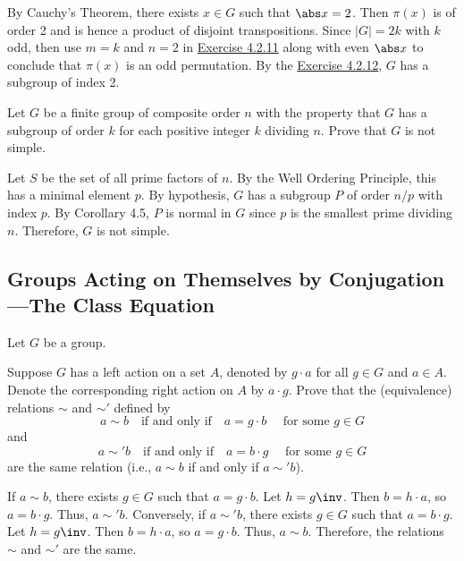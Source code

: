 \begin{sol}
	By Cauchy's Theorem, there exists $x \in G$ such that $\abs x = 2$. Then $\pi(x)$ is of order 2 and is hence a product of disjoint transpositions. Since $|G| = 2k$ with $k$ odd, then use $m = k$ and $n = 2$ in \hyperref[ex4.2.11]{Exercise 4.2.11} along with even $\abs x$ to conclude that $\pi(x)$ is an odd permutation. By the \hyperref[ex4.2.12]{Exercise 4.2.12}, $G$ has a subgroup of index 2.
\end{sol}

\begin{exercise}
	Let $G$ be a finite group of composite order $n$ with the property that $G$ has a subgroup of order $k$ for each positive integer $k$ dividing $n$. Prove that $G$ is not simple.
\end{exercise}

\begin{sol}
	Let $S$ be the set of all prime factors of $n$. By the Well Ordering Principle, this has a minimal element $p$. By hypothesis, $G$ has a subgroup $P$ of order $n/p$ with index $p$. By Corollary 4.5, $P$ is normal in $G$ since $p$ is the smallest prime dividing $n$. Therefore, $G$ is not simple.
\end{sol}

\newpage

\subsection{Groups Acting on Themselves by Conjugation---The Class Equation}

Let $G$ be a group.

\begin{specialexercise}
	Suppose $G$ has a left action on a set $A$, denoted by $g \cdot a$ for all $g \in G$ and $a \in A$. Denote the corresponding right action on $A$ by $a \cdot g$. Prove that the (equivalence) relations $\sim$ and $\sim'$ defined by
	\[ a \sim b \quad \text{if and only if} \quad a = g \cdot b \quad \text{ for some } g \in G \]
	and
	\[ a \sim' b \quad \text{if and only if} \quad a = b \cdot g \quad \text{ for some } g \in G \]
	are the same relation (i.e., $a \sim b$ if and only if $a \sim' b$).
\end{specialexercise}

\begin{sol}
	If $a \sim b$, there exists $g \in G$ such that $a = g \cdot b$. Let $h = g\inv$. Then $b = h \cdot a$, so $a = b \cdot g$. Thus, $a \sim' b$. Conversely, if $a \sim' b$, there exists $g \in G$ such that $a = b \cdot g$. Let $h = g\inv$. Then $b = h \cdot a$, so $a = g \cdot b$. Thus, $a \sim b$. Therefore, the relations $\sim$ and $\sim'$ are the same.
\end{sol}

